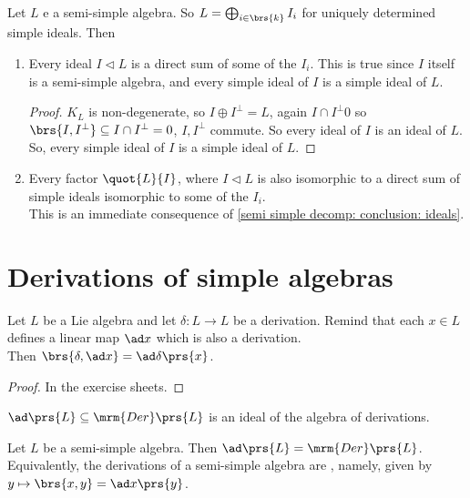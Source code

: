 \documentclass[10pt,a4paper,twoside,openany,hidelinks]{book}
\begin{document}
\begin{conclusion}
Let $L$ e a semi-simple algebra. So $L = \bigoplus_{i\in\brs{k}} I_i$ for uniquely determined simple ideals. Then
\begin{enumerate}
\item Every ideal $I \triangleleft L$ is a direct sum of some of the $I_i$. This is true since $I$ itself is a semi-simple algebra, and every simple ideal of $I$ is a simple ideal of $L$.\\ \label{semi simple decomp: conclusion: ideals}
\begin{proof}
$K_L$ is non-degenerate, so $I \oplus I^{\perp} = L$, again $I \cap I^{\perp} 0$ so $\brs{I,I^{\perp}} \subseteq I \cap I^{\perp} = 0$, $I, I^{\perp}$ commute. So every ideal of $I$ is an ideal of $L$. So, every simple ideal of $I$ is a simple ideal of $L$.
\end{proof}

\item Every factor $\quot{L}{I}$, where $I \triangleleft L$ is also isomorphic to a direct sum of simple ideals isomorphic to some of the $I_i$.\\
This is an immediate consequence of \ref{semi simple decomp: conclusion: ideals}.

\end{enumerate}
\end{conclusion}

\chapter{Derivations of simple algebras}

\begin{lemma}
Let $L$ be a Lie algebra and let $\delta \colon L \to L$ be a derivation. Remind that each $x \in L$ defines a linear map $\ad x$ which is also a derivation.\\
Then $\brs{\delta, \ad x} = \ad \delta\prs{x}$.
\end{lemma}
\begin{proof}
In the exercise sheets.
\end{proof}

\begin{conclusion}
$\ad\prs{L} \subseteq \mrm{Der}\prs{L}$ is an ideal of the algebra of derivations.
\end{conclusion}

\begin{theorem}
Let $L$ be a semi-simple algebra. Then $\ad \prs{L} = \mrm{Der}\prs{L}$.\\
Equivalently, the derivations of a semi-simple algebra are , namely, given by $y \mapsto \brs{x,y} = \ad x \prs{y}$. 
\end{theorem}

\backmatter
\end{document}
